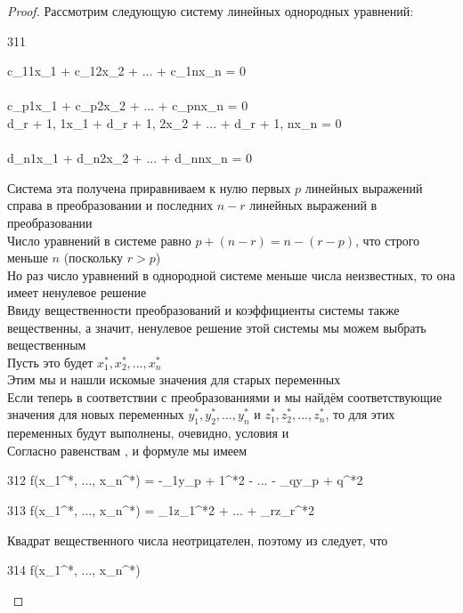 \begin{proof}
	Рассмотрим следующую систему линейных однородных уравнений:
	\begin{equ}{311}
		\begin{rcases}
			c_{11}x_1 + c_{12}x_2 + ... + c_{1n}x_n = 0 \\
			\widedots \\
			c_{p1}x_1 + c_{p2}x_2 + ... + c_{pn}x_n = 0 \\
			d_{r + 1, 1}x_1 + d_{r + 1, 2}x_2 + ... + d_{r + 1, n}x_n = 0 \\
			\widedots \\
			d_{n1}x_1 + d_{n2}x_2 + ... + d_{nn}x_n = 0
		\end{rcases}
	\end{equ}
	Система эта получена приравниваем к нулю первых $ p $ линейных выражений справа в преобразовании  и последних $ n - r $ линейных выражений в преобразовании  \\
	Число уравнений в системе  равно $ p + (n - r) = n - (r - p) $, что строго меньше $ n $ (поскольку $ r > p $) \\
	Но раз число уравнений в однородной системе меньше числа неизвестных, то она имеет ненулевое решение \\
	Ввиду вещественности преобразований  и  коэффициенты системы  также вещественны, а значит, ненулевое решение этой системы мы можем выбрать вещественным \\
	Пусть это будет $ x_1^*, x_2^*, ..., x_n^* $ \\
	Этим мы и нашли искомые значения для старых переменных \\
	Если теперь в соответствии с преобразованиями  и  мы найдём соответствующие значения для новых переменных $ y_1^*, y_2^*, ..., y_n^* $ и $ z_1^*, z_2^*, ..., z_n^* $, то для этих переменных будут выполнены, очевидно, условия  и  \\
	Согласно равенствам ,  и формуле  мы имеем
	\begin{equ}{312}
		f(x_1^*, ..., x_n^*) = -\beta_1y_{p + 1}^{*2} - ... - \beta_qy_{p + q}^{*2}
	\end{equ}
	\begin{equ}{313}
		f(x_1^*, ..., x_n^*) = \gamma_1z_1^{*2} + ... + \gamma_rz_r^{*2}
	\end{equ}
	Квадрат вещественного числа неотрицателен, поэтому из  следует, что
	\begin{equ}{314}
		f(x_1^*, ..., x_n^*) 
	\end{equ}

\end{proof}
